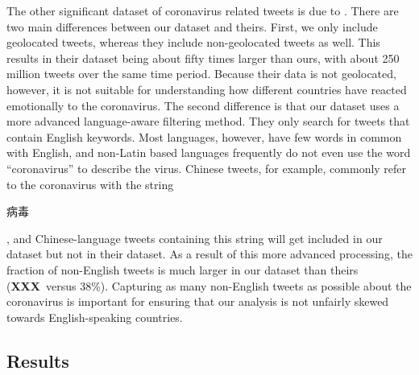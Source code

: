\documentclass[11pt]{article}
\newcommand{\XXX}{{\textbf{XXX}}~}
\newcommand{\bertmoji}{\texttt{BERTmoticon}}
\DeclareMathOperator{\emoticon}{\texttt{TwitterEmoticon}}
\DeclareMathOperator{\corona}{\texttt{TwitterCorona}}
\begin{document}
The other significant dataset of coronavirus related tweets is due to \citet{chen2020tracking}.
There are two main differences between our dataset and theirs.
First, we only include geolocated tweets,
whereas they include non-geolocated tweets as well.
This results in their dataset being about fifty times larger than ours,
with about 250 million tweets over the same time period.
Because their data is not geolocated, however, it is not suitable for understanding how different countries have reacted emotionally to the coronavirus.
The second difference is that our dataset uses a more advanced language-aware filtering method.
They only search for tweets that contain English keywords.
Most languages, however, have few words in common with English,
and non-Latin based languages frequently do not even use the word ``coronavirus'' to describe the virus.
Chinese tweets, for example, commonly refer to the coronavirus with the string
\begin{CJK}{UTF8}{gbsn}
病毒
\end{CJK},
and Chinese-language tweets containing this string will get included in our dataset but not in their dataset.
As a result of this more advanced processing, the fraction of non-English tweets is much larger in our dataset than theirs (\XXX versus 38\%).
Capturing as many non-English tweets as possible about the coronavirus is important for ensuring that our analysis is not unfairly skewed towards English-speaking countries.



\subsection{Results}
\end{document}

